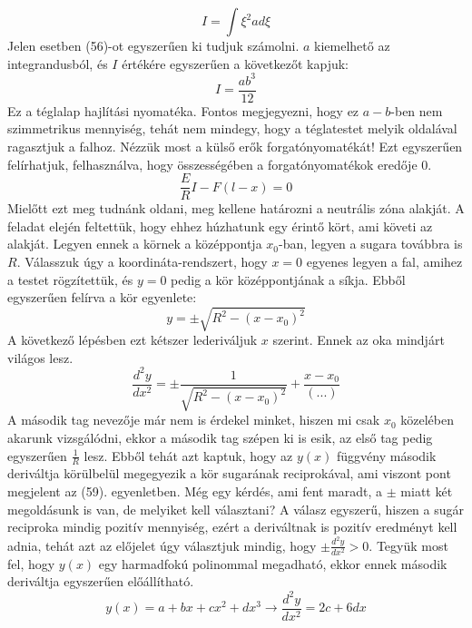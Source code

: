 \documentclass[a4paper,12pt]{article}
\begin{document}
\begin{equation}
I=\int\xi^2ad\xi
\end{equation}
Jelen esetben (56)-ot egyszerűen ki tudjuk számolni. $a$ kiemelhető az integrandusból, és $I$ értékére egyszerűen a következőt kapjuk:
\begin{equation}
I=\frac{ab^3}{12}
\end{equation}
Ez a téglalap hajlítási nyomatéka. Fontos megjegyezni, hogy ez $a-b$-ben nem szimmetrikus mennyiség, tehát nem mindegy, hogy a téglatestet melyik oldalával ragasztjuk a falhoz.
Nézzük most a külső erők forgatónyomatékát! Ezt egyszerűen felírhatjuk, felhasználva, hogy összességében a forgatónyomatékok eredője 0.
\begin{equation}
\frac{E}{R}I-F(l-x)=0
\end{equation}
Mielőtt ezt meg tudnánk oldani, meg kellene határozni a neutrális zóna alakját. A feladat elején feltettük, hogy ehhez húzhatunk egy érintő kört, ami követi az alakját. Legyen ennek a körnek a középpontja $x_0$-ban, legyen a sugara továbbra is $R$. Válasszuk úgy a koordináta-rendszert, hogy $x=0$ egyenes legyen a fal, amihez a testet rögzítettük, és $y=0$ pedig a kör középpontjának a síkja. Ebből egyszerűen felírva a kör egyenlete:
\begin{equation}
y=\pm\sqrt{R^2-(x-x_0)^2}
\end{equation}
A következő lépésben ezt kétszer lederiváljuk $x$ szerint. Ennek az oka mindjárt világos lesz.
\begin{equation}
\frac{d^2y}{dx^2}=\pm\frac{1}{\sqrt{R^2-(x-x_0)^2}}+\frac{x-x_0}{(...)}
\end{equation}
A második tag nevezője már nem is érdekel minket, hiszen mi csak $x_0$ közelében akarunk vizsgálódni, ekkor a második tag szépen ki is esik, az első tag pedig egyszerűen $\frac{1}{R}$ lesz. Ebből tehát azt kaptuk, hogy az $y(x)$ függvény második deriváltja körülbelül megegyezik a kör sugarának reciprokával, ami viszont pont megjelent az (59). egyenletben. Még egy kérdés, ami fent maradt, a $\pm$ miatt két megoldásunk is van, de melyiket kell választani? A válasz egyszerű, hiszen a sugár reciproka mindig pozitív mennyiség, ezért a deriváltnak is pozitív eredményt kell adnia, tehát azt az előjelet úgy választjuk mindig, hogy $\pm\frac{d^2y}{dx^2}>0$.
Tegyük most fel, hogy $y(x)$ egy harmadfokú polinommal megadható, ekkor ennek második deriváltja egyszerűen előállítható.
\begin{equation}
y(x)=a+bx+cx^2+dx^3 \rightarrow \frac{d^2y}{dx^2}=2c+6dx
\end{equation}
\end{document}
